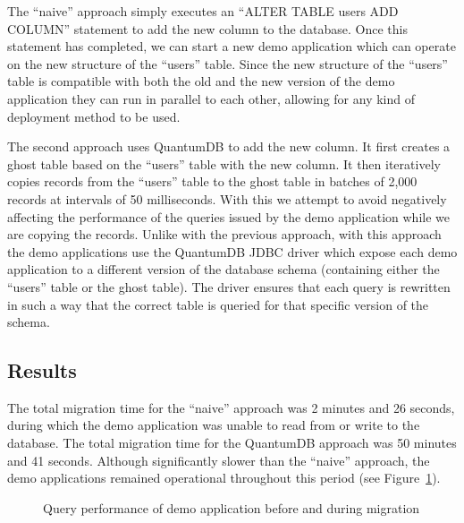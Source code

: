 \documentclass[conference]{IEEEtran}
\begin{document}
The ``naive'' approach simply executes an ``ALTER TABLE users ADD COLUMN'' statement to add the new column to the database. Once this statement has completed, we can start a new demo application which can operate on the new structure of the ``users'' table. Since the new structure of the ``users'' table is compatible with both the old and the new version of the demo application they can run in parallel to each other, allowing for any kind of deployment method to be used. 

The second approach uses QuantumDB to add the new column. It first creates a ghost table based on the ``users'' table with the new column. It then iteratively copies records from the ``users'' table to the ghost table in batches of 2,000 records at intervals of 50 milliseconds. With this we attempt to avoid negatively affecting the performance of the queries issued by the demo application while we are copying the records. Unlike with the previous approach, with this approach the demo applications use the QuantumDB JDBC driver which expose each demo application to a different version of the database schema (containing either the ``users'' table or the ghost table). The driver ensures that each query is rewritten in such a way that the correct table is queried for that specific version of the schema.


\subsection{Results}
\label{sec:results}

The total migration time for the ``naive'' approach was 2 minutes and 26 seconds, during which the demo application was unable to read from or write to the database. The total migration time for the QuantumDB approach was 50 minutes and 41 seconds. Although significantly slower than the ``naive'' approach, the demo applications remained operational throughout this period (see Figure~\ref{fig:migration}).

\begin{figure}%
    \centering
    \qquad
    \caption{Query performance of demo application before and during migration}%
    \label{fig:migration}%
\end{figure}
\end{document}
